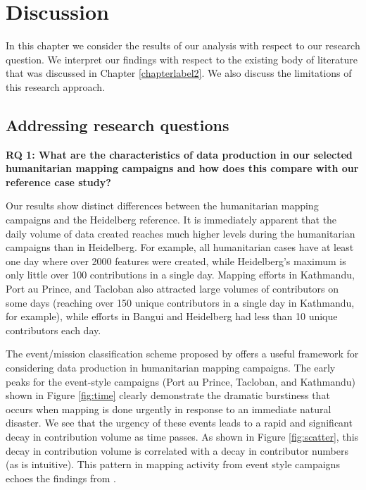 \chapter{Discussion}
\label{chapterlabel6}

In this chapter we consider the results of our analysis with respect to our research question. We interpret our findings with respect to the existing body of literature that was discussed in Chapter \ref{chapterlabel2}. We also discuss the limitations of this research approach. 

\section{Addressing research questions}

\noindent\textbf{RQ 1: What are the characteristics of data production in our selected humanitarian mapping campaigns and how does this compare with our reference case study?} 

Our results show distinct differences between the humanitarian mapping campaigns and the Heidelberg reference. It is immediately apparent that the daily volume of data created reaches much higher levels during the humanitarian campaigns than in Heidelberg. For example, all humanitarian cases have at least one day where over 2000 features were created, while Heidelberg's maximum is only little over 100 contributions in a single day. Mapping efforts in Kathmandu, Port au Prince, and Tacloban also attracted large volumes of contributors on some days (reaching over 150 unique contributors in a single day in Kathmandu, for example), while efforts in Bangui and Heidelberg had less than 10 unique contributors each day. 

The event/mission classification scheme proposed by \textcite{dittus_mass_2017} offers a useful framework for considering data production in humanitarian mapping campaigns. The early peaks for the event-style campaigns (Port au Prince, Tacloban, and Kathmandu) shown in Figure \ref{fig:time} clearly demonstrate the dramatic burstiness that occurs when mapping is done urgently in response to an immediate natural disaster. We see that the urgency of these events leads to a rapid and significant decay in contribution volume as time passes. As shown in Figure \ref{fig:scatter}, this decay in contribution volume is correlated with a decay in contributor numbers (as is intuitive). This pattern in mapping activity from event style campaigns echoes the findings from \textcite[p. 1294]{dittus_mass_2017}.

